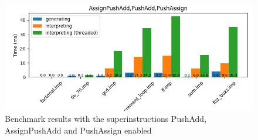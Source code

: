 \documentclass{article}
\begin{document}
\begin{figure}[h]
    \centering
    \includegraphics[width=1\textwidth]{../BenchmarkImages/AssignPushAdd_PushAdd_PushAssign.png}
    \caption{Benchmark results with the superinstructions PushAdd, AssignPushAdd and PushAssign enabled}
    \label{fig:all_op}
\end{figure}
\end{document}
